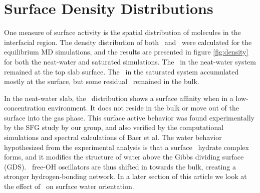 \section{Surface Density Distributions}

One measure of surface activity is the spatial distribution of molecules in the interfacial region. The density distribution of both \wat~and \suldiox~were calculated for the equilibrium MD simulations, and the results are presented in figure \ref{fig:density} for both the neat-water and saturated simulations. The \suldiox~in the neat-water system remained at the top slab surface. The \suldiox~in the saturated system accumulated mostly at the surface, but some residual \suldiox~remained in the bulk.



In the neat-water slab, the \suldiox~distribution shows a surface affinity when in a low-concentration environment. It does not reside in the bulk or move out of the surface into the gas phase. This surface active behavior was found experimentally by the SFG study by our group,\cite{Tarbuck2005,Tarbuck2006} and also verified by the computational simulations and spectral calculations of Baer et al.\cite{Baer2010} The water behavior hypothesized from the experimental analysis is that a surface \suldiox~hydrate complex forms, and it modifies the structure of water above the Gibbs dividing surface (GDS). \wat~free-OH oscillators are thus shifted in towards the bulk, creating a stronger hydrogen-bonding network. In a later section of this article we look at the effect of \suldiox~on surface water orientation.

